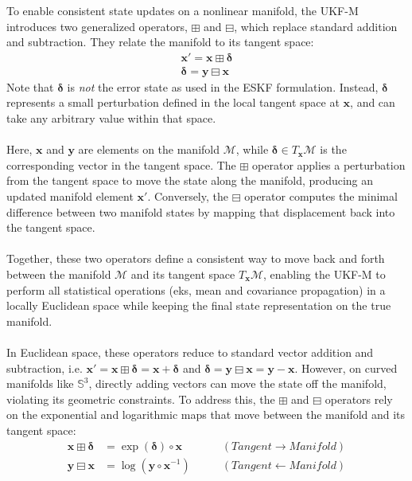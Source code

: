 \noindent
To enable consistent state updates on a nonlinear manifold, the UKF-M introduces two generalized operators, $\boxplus$ and $\boxminus$, which replace standard addition and subtraction. They relate the manifold to its tangent space:
$$
\begin{aligned}
    \mathbf{x}' = \mathbf{x} \boxplus \boldsymbol{\delta} \\
    \boldsymbol{\delta} = \mathbf{y} \boxminus \mathbf{x}
\end{aligned}
$$
Note that $\boldsymbol{\delta}$ is \textit{not} the error state as used in the ESKF formulation. Instead, $\boldsymbol{\delta}$ represents a small perturbation defined in the local tangent space at $\mathbf{x}$, and can take any arbitrary value within that space.  
\\ \\
Here, $\mathbf{x}$ and $\mathbf{y}$ are elements on the manifold $\mathcal{M}$, while $\boldsymbol{\delta} \in T_\mathbf{x}\mathcal{M}$ is the corresponding vector in the tangent space. The $\boxplus$ operator applies a perturbation from the tangent space to move the state along the manifold, producing an updated manifold element $\mathbf{x}'$. Conversely, the $\boxminus$ operator computes the minimal difference between two manifold states by mapping that displacement back into the tangent space.  
\\ \\
Together, these two operators define a consistent way to move back and forth between the manifold $\mathcal{M}$ and its tangent space $T_\mathbf{x}\mathcal{M}$, enabling the UKF-M to perform all statistical operations (eks, mean and covariance propagation) in a locally Euclidean space while keeping the final state representation on the true manifold. 
\\ \\
In Euclidean space, these operators reduce to standard vector addition and subtraction, i.e.
$\mathbf{x}' = \mathbf{x} \boxplus \boldsymbol{\delta} = \mathbf{x} + \boldsymbol{\delta}$ and $\boldsymbol{\delta} = \mathbf{y} \boxminus \mathbf{x} = \mathbf{y} - \mathbf{x}$. However, on curved manifolds like $\mathbb{S}^3$, directly adding vectors can move the state off the manifold, violating its geometric constraints. To address this, the $\boxplus$ and $\boxminus$ operators rely on the exponential and logarithmic maps that move between the manifold and its tangent space:
$$
\begin{aligned}
    \mathbf{x} \boxplus \mathbf{\delta} &= \exp(\mathbf{\delta}) \circ \mathbf{x} &\qquad (Tangent \rightarrow Manifold) \\
    \mathbf{y} \boxminus \mathbf{x} &= \log(\mathbf{y} \circ \mathbf{x}^{-1}) &\qquad (Tangent \leftarrow Manifold)
\end{aligned}
$$
